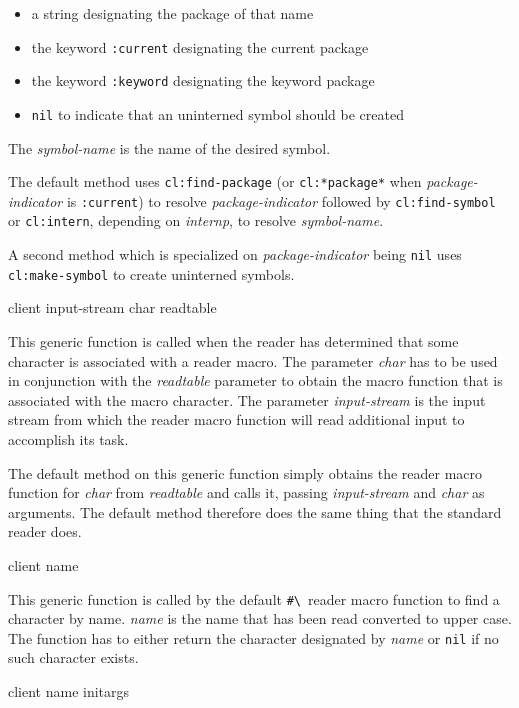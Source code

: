\begin{itemize}
\item a string designating the package of that name
\item the keyword \texttt{:current} designating the current package
\item the keyword \texttt{:keyword} designating the keyword package
\item \texttt{nil} to indicate that an uninterned symbol should be
  created
\end{itemize}

The \textit{symbol-name} is the name of the desired symbol.

The default method uses \texttt{cl:find-package} (or
\texttt{cl:*package*} when \textit{package-indicator} is
\texttt{:current}) to resolve \textit{package-indicator} followed by
\texttt{cl:find-symbol} or \texttt{cl:intern}, depending on
\textit{internp}, to resolve \textit{symbol-name}.

A second method which is specialized on \textit{package-indicator}
being \texttt{nil} uses \texttt{cl:make-symbol} to create uninterned
symbols.

 {client input-stream char readtable}

This generic function is called when the reader has determined that
some character is associated with a reader macro.  The parameter
\textit{char} has to be used in conjunction with the
\textit{readtable} parameter to obtain the macro function that is
associated with the macro character.  The parameter
\textit{input-stream} is the input stream from which the reader macro
function will read additional input to accomplish its task.

The default method on this generic function simply obtains the reader
macro function for \textit{char} from \textit{readtable} and calls it,
passing \textit{input-stream} and \textit{char} as arguments.  The
default method therefore does the same thing that the standard
\commonlisp{} reader does.

 {client name}

This generic function is called by the default
\texttt{\#\textbackslash}~reader macro function to find a character by
name.  \textit{name} is the name that has been read converted to upper
case.  The function has to either return the character designated by
\textit{name} or \texttt{nil} if no such character exists.

 {client name initargs}


